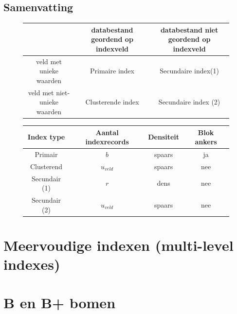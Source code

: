 \documentclass[indexstructuren.tex]{subfiles}
\begin{document}
\subsection{Samenvatting}
\begin{figure}[H]
\centering
\begin{tabular}{c|c|c|}
& databestand geordend op indexveld & databestand niet geordend op indexveld\\\hline
veld met unieke waarden & Primaire index & Secundaire index(1)\\\hline
veld met niet-unieke waarden & Clusterende index & Secundaire index (2)\\\hline
\end{tabular}
\end{figure}
\begin{figure}[H]
\centering
\begin{tabular}{c|c|c|c}
Index type & Aantal indexrecords & Densiteit & Blok ankers\\\hline\hline
Primair & $b$ & spaars & ja\\
Clusterend & $u_{veld}$ & spaars & nee\\
Secundair (1) & $r$ & dens & nee\\
Secundair (2) & $u_{veld}$ & spaars & nee\\
\end{tabular}
\end{figure}

\section{Meervoudige indexen (multi-level indexes)}

\section{B en B+ bomen}
\end{document}

